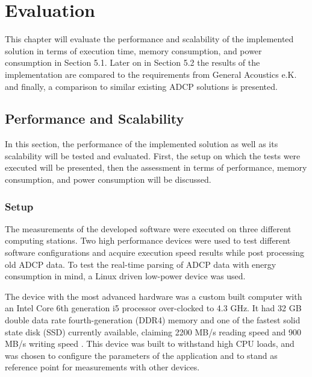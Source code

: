 \chapter{Evaluation}
This chapter will evaluate the performance and scalability of the implemented solution in terms of execution time, memory consumption, and power consumption in Section 5.1. Later on in Section 5.2 the results of the implementation are compared to the requirements from General Acoustics e.K. and finally, a comparison to similar existing ADCP solutions is presented.

\section{Performance and Scalability}
In this section, the performance of the implemented solution as well as its scalability will be tested and evaluated. First, the setup on which the tests were executed will be presented, then the assessment in terms of performance, memory consumption, and power consumption will be discussed. 
\subsection{Setup}
The measurements of the developed software were executed on three different computing stations. Two high performance devices were used to test different software configurations and acquire execution speed results while post processing old ADCP data. To test the real-time parsing of ADCP data with energy consumption in mind, a Linux driven low-power device was used.

The device with the most advanced hardware was a custom built computer with an Intel Core 6th generation i5 processor \cite{i5} over-clocked to 4.3 GHz. It had 32 GB double data rate fourth-generation (DDR4) memory \cite{ddr4} and one of the fastest solid state disk (SSD) currently available, claiming 2200 MB/s reading speed and 900 MB/s writing speed \cite{ssd}. This device was built to withstand high CPU loads, and was chosen to configure the parameters of the application and to stand as reference point for measurements with other devices.

